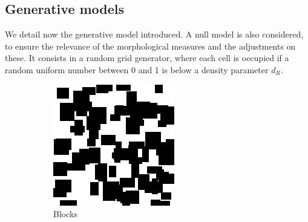 \documentclass[letterpaper]{article}
\begin{document}
\subsection{Generative models}

We detail now the generative model introduced. A null model is also considered, to ensure the relevance of the morphological measures and the adjustments on these. It consists in a random grid generator, where each cell is occupied if a random uniform number between 0 and 1 is below a density parameter $d_R$.

\begin{figure}
    \centering
    \begin{subfigure}[b]{0.2\textwidth}
        \includegraphics[width=\textwidth]{blocks}
        \caption{Blocks}
        \label{fig:blocks}
    \end{subfigure}
    \begin{subfigure}[b]{0.2\textwidth}

\end{subfigure}
\end{figure}
\end{document}
